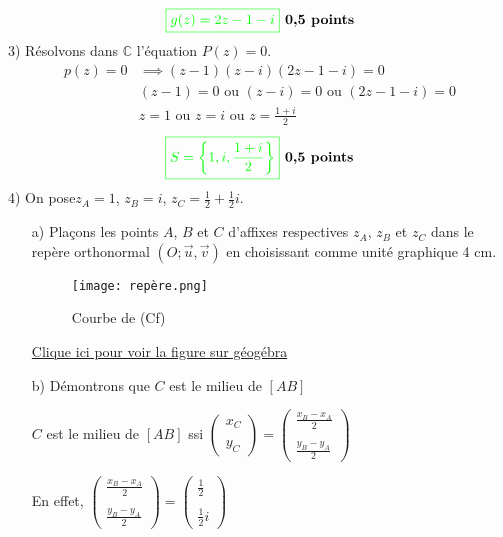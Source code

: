 \documentclass[12pt]{article}
\begin{document}
\[
\textcolor{green}{\boxed{ g(z)=2z-1-i }} \textbf{ 0,5 points}
\]
3) Résolvons dans \( \mathbb{C} \) l'équation \( P(z) = 0 \). \\

\begin{align*}
p(z)=0&\implies (z-1)(z-i)(2z-1-i)=0\\
&(z-1)=0 \text{ ou }(z-i)=0 \text{ ou } (2z-1-i)=0\\
&z=1 \text{ ou }z=i \text{ ou } z=\frac{1+i}{2}
\end{align*}
\[
\textcolor{green}{\boxed{ S=\left\lbrace 1,i,\frac{1+i}{2} \right\rbrace  }} \textbf{ 0,5 points}
\]
4) On pose\( z_A = 1 \), \( z_B = i \), \( z_C = \frac{1}{2}+\frac{1}{2}i \).
\begin{itemize}
\item[a)] Plaçons les points \( A \), \( B \) et \( C \) d'affixes respectives \( z_A\), \( z_B \) et \( z_C \) dans le repère orthonormal \( (O; \vec{u}, \vec{v}) \) en choisissant comme unité graphique 4 cm. \\ 
\newpage
\begin{figure}[h]
\centering
\texttt{[image: repère.png]}
\caption{Courbe de (Cf)}
\label{fig:monimage}
\end{figure}
\href{https://www.geogebra.org/classic/kdbk8kpp}{Clique ici pour voir la figure sur géogébra}

\item[b)] Démontrons que \( C \) est le milieu de \( [AB] \)

\( C \) est le milieu de \( [AB] \) ssi $\begin{pmatrix}x_{C} \\ \\ y_{C}\end{pmatrix}=
\begin{pmatrix}\frac{x_{B}-x_{A}}{2} \\ \\ \frac{y_{B}-y_{A}}{2}\end{pmatrix}$

En effet, $\begin{pmatrix}\frac{x_{B}-x_{A}}{2} \\ \\ \frac{y_{B}-y_{A}}{2}\end{pmatrix}=
\begin{pmatrix}\frac{1}{2} \\ \\ \frac{1}{2}i\end{pmatrix}$


\end{itemize}
\end{document}
